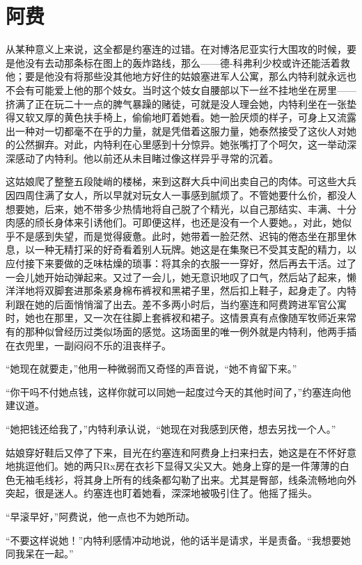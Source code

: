 \chapter{阿费}
 
    从某种意义上来说，这全都是约塞连的过错。在对博洛尼亚实行大围攻的时候，要是他没有去动那条标在图上的轰炸路线，那么——德-科弗利少校或许还能活着救他；要是他没有将那些没其他地方好住的姑娘塞进军人公寓，那么内特利就永远也不会有可能爱上他的那个妓女。当时这个妓女自腰部以下一丝不挂地坐在房里——挤满了正在玩二十一点的脾气暴躁的赌徒，可就是没人理会她，内特利坐在一张垫得又软又厚的黄色扶手椅上，偷偷地盯着她看。她一脸厌烦的样子，可身上又流露出一种对一切都毫不在乎的力量，就是凭借着这服力量，她泰然接受了这伙人对她的公然摒弃。对此，内特利在心里感到十分惊异。她张嘴打了个呵欠，这一举动深深感动了内特利。他以前还从未目睹过像这样异乎寻常的沉着。

    这姑娘爬了整整五段陡峭的楼梯，来到这群大兵中间出卖自己的肉体。可这些大兵因四周住满了女人，所以早就对玩女人一事感到腻烦了。不管她要什么价，都没人想要她，后来，她不带多少热情地将自己脱了个精光，以自己那结实、丰满、十分肉感的颀长身体来引诱他们。可即便这样，也还是没有一个人要她。，对此，她似乎不是感到失望，而是觉得疲惫。此时，她带着一脸茫然、迟钝的倦态坐在那里休息，以一种无精打采的好奇看着别人玩牌。她这是在集聚已不受其支配的精力，以应付接下来要做的乏味枯燥的琐事：将其余的衣服一一穿好，然后再去干活。过了一会儿她开始动弹起来。又过了一会儿，她无意识地叹了口气，然后站了起来，懒洋洋地将双脚套进那条紧身棉布裤衩和黑裙子里，然后扣上鞋子，起身走了。内特利跟在她的后面悄悄溜了出去。差不多两小时后，当约塞连和阿费跨进军官公寓时，她也在那里，又一次在往脚上套裤衩和裙子。这情景真有点像随军牧师近来常有的那种似曾经历过类似场面的感觉。这场面里的唯一例外就是内特利，他两手插在衣兜里，一副闷闷不乐的沮丧样子。

    “她现在就要走，”他用一种微弱而又奇怪的声音说，“她不肯留下来。”

    “你干吗不付她点钱，这样你就可以同她一起度过今天的其他时间了，”约塞连向他建议道。

    “她把钱还给我了，”内特利承认说，“她现在对我感到厌倦，想去另找一个人。”

    姑娘穿好鞋后又停了下来，目光在约塞连和阿费身上扫来扫去，她这是在不怀好意地挑逗他们。她的两只Rx房在衣衫下显得又尖又大。她身上穿的是一件薄薄的白色无袖毛线衫，将其身上所有的线条都勾勒了出来。尤其是臀部，线条流畅地向外突起，很是迷人。约塞连也盯着她看，深深地被吸引住了。他摇了摇头。

    “早滚早好，”阿费说，他一点也不为她所动。

    “不要这样说她！”内特利感情冲动地说，他的话半是请求，半是责备。“我想要她同我呆在一起。”

